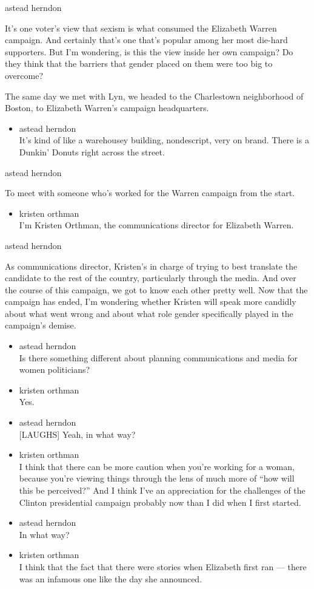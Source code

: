 astead herndon

It's one voter's view that sexism is what consumed the Elizabeth Warren
campaign. And certainly that's one that's popular among her most
die-hard supporters. But I'm wondering, is this the view inside her own
campaign? Do they think that the barriers that gender placed on them
were too big to overcome?

The same day we met with Lyn, we headed to the Charlestown neighborhood
of Boston, to Elizabeth Warren's campaign headquarters.

\begin{itemize}
\tightlist
\item
  astead herndon\\
  It's kind of like a warehousey building, nondescript, very on brand.
  There is a Dunkin' Donuts right across the street.
\end{itemize}

astead herndon

To meet with someone who's worked for the Warren campaign from the
start.

\begin{itemize}
\tightlist
\item
  kristen orthman\\
  I'm Kristen Orthman, the communications director for Elizabeth Warren.
\end{itemize}

astead herndon

As communications director, Kristen's in charge of trying to best
translate the candidate to the rest of the country, particularly through
the media. And over the course of this campaign, we got to know each
other pretty well. Now that the campaign has ended, I'm wondering
whether Kristen will speak more candidly about what went wrong and about
what role gender specifically played in the campaign's demise.

\begin{itemize}
\item
  astead herndon\\
  Is there something different about planning communications and media
  for women politicians?
\item
  kristen orthman\\
  Yes.
\item
  astead herndon\\
  {[}LAUGHS{]} Yeah, in what way?
\item
  kristen orthman\\
  I think that there can be more caution when you're working for a
  woman, because you're viewing things through the lens of much more of
  ``how will this be perceived?'' And I think I've an appreciation for
  the challenges of the Clinton presidential campaign probably now than
  I did when I first started.
\item
  astead herndon\\
  In what way?
\item
  kristen orthman\\
  I think that the fact that there were stories when Elizabeth first ran
  --- there was an infamous one like the day she announced.
\end{itemize}

